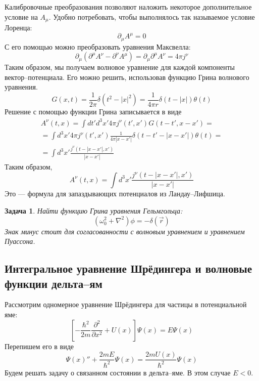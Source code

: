 \documentclass{article}
\newtheorem{problem}{Задача}
\begin{document}
Калибровочные преобразования позволяют наложить некоторое дополнительное условие на $A_\mu$.
Удобно потребовать, чтобы выполнялось так называемое условие Лоренца:
\begin{equation}
    \label{lorentz_condition}
    \partial_\mu A^\mu = 0
\end{equation}
С его помощью можно преобразовать уравнения Максвелла:
\begin{equation}
    \partial_\mu (\partial^\mu A^\nu - \partial^\nu A^\mu) = 
        \partial_\mu \partial^\mu A^\nu = 4\pi j^\nu
\end{equation}
Таким образом, мы получаем волновое уравнение для каждой компоненты вектор--потенциала.
Его можно решить, использовав функцию Грина волнового уравнения.
\begin{equation}
    G(x,t) = \frac{1}{2\pi} \delta(t^2 - |x|^2) =
        \frac{1}{4\pi r} \delta(t - |x|)\theta(t)
\end{equation}
Решение с помощью функции Грина записывается в виде
\begin{multline}
    A^\nu(t,x) = \int dt' d^3x'  4\pi j^\nu(t',x') G(t-t',x-x') = \\
        =\int d^3 x' 4\pi j^\nu(t',x') 
            \frac{1}{4\pi |x - x'|} \delta(t-t'-|x-x'|)\theta(t) = \\
            =\int d^3 x' \frac{j^{\nu}(t - |x - x'|, x')}{|x - x'|}
\end{multline}
Таким образом, 
\begin{equation}
   A^\nu(t,x)=\int d^3 x' \frac{j^{\nu}(t - |x - x'|, x')}{|x - x'|}
\end{equation}
Это --- формула для запаздывающих потенциалов из Ландау--Лифшица.

\begin{problem}
    Найти функцию Грина уравнения Гельмгольца:
    \begin{equation}
        (\omega_0^2 + \nabla^2)\phi = -\delta(\vec{r})
    \end{equation}
    Знак минус стоит для согласованности с волновым уравнением и уравнением Пуассона. 
\end{problem}

\subsection{Интегральное уравнение Шрёдингера и волновые функции дельта--ям}
Рассмотрим одномерное уравнение Шрёдингера для частицы в потенциальной яме:
\begin{equation}
    \left[-\frac{\hbar^2}{2m} \frac{\partial^2}{\partial x^2} + U(x)\right] \Psi(x) = E\Psi(x)
\end{equation}
Перепишем его в виде
\begin{equation}
    \label{schrodinger_mod}
    \Psi(x)'' + \frac{2mE}{\hbar^2}\Psi(x) = \frac{2mU(x)}{\hbar^2} \Psi(x)
\end{equation}
Будем решать задачу о связанном состоянии в дельта--яме. В этом случае $E < 0$. 
\end{document}

